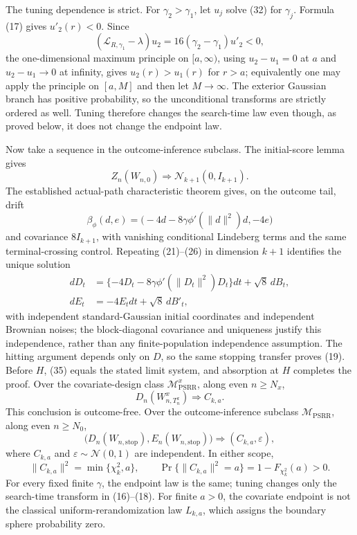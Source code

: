 The tuning dependence is strict.  For \(\gamma_2>\gamma_1\), let \(u_j\) solve (32) for \(\gamma_j\).  Formula (17) gives \(u'_2(r)<0\).  Since
\[
 (\mathcal L_{R,\gamma_1}-\lambda)u_2
 =16(\gamma_2-\gamma_1)u'_2<0, \tag{33}
\]
the one-dimensional maximum principle on \([a,\infty)\), using \(u_2-u_1=0\) at \(a\) and \(u_2-u_1\to0\) at infinity, gives \(u_2(r)>u_1(r)\) for \(r>a\); equivalently one may apply the principle on \([a,M]\) and then let \(M\to\infty\).  The exterior Gaussian branch has positive probability, so the unconditional transforms are strictly ordered as well.  Tuning therefore changes the search-time law even though, as proved below, it does not change the endpoint law.

Now take a sequence in the outcome-inference subclass.  The initial-score lemma gives
\[
 Z_n(W_{n,0})\Rightarrow\mathcal N_{k+1}(0,I_{k+1}). \tag{34}
\]
The established actual-path characteristic theorem gives, on the outcome tail, drift
\[
 \beta_\phi(d,e)=\bigl(-4d-8\gamma\phi'(\|d\|^2)d,-4e\bigr)
\]
and covariance \(8I_{k+1}\), with vanishing conditional Lindeberg terms and the same terminal-crossing control.  Repeating (21)--(26) in dimension \(k+1\) identifies the unique solution
\[
 \begin{split}
 dD_t&=\{-4D_t-8\gamma\phi'(\|D_t\|^2)D_t\}dt+\sqrt8\,dB_t,\\
 dE_t&=-4E_tdt+\sqrt8\,dB'_t,
 \end{split} \tag{35}
\]
with independent standard-Gaussian initial coordinates and independent Brownian noises; the block-diagonal covariance and uniqueness justify this independence, rather than any finite-population independence assumption.  The hitting argument depends only on \(D\), so the same stopping transfer proves (19).  Before \(H\), (35) equals the stated limit system, and absorption at \(H\) completes the proof.
Over the covariate-design class \(\mathcal M_{\mathrm{PSRR}}^{x}\), along even \(n\ge N_x\),
\[
 D_n(W^x_{n,T_n^x})\Rightarrow C_{k,a}.
\]
This conclusion is outcome-free.  Over the outcome-inference subclass \(\mathcal M_{\mathrm{PSRR}}\), along even \(n\ge N_0\),
\[
 \bigl(D_n(W_{n,\mathrm{stop}}),E_n(W_{n,\mathrm{stop}})\bigr)
 \Rightarrow(C_{k,a},\varepsilon),
\]
where \(C_{k,a}\) and \(\varepsilon\sim\mathcal N(0,1)\) are independent.  In either scope,
\[
 \|C_{k,a}\|^2=\min\{\chi_k^2,a\},
 \qquad
 \Pr\{\|C_{k,a}\|^2=a\}=1-F_{\chi_k^2}(a)>0.
\]
For every fixed finite \(\gamma\), the endpoint law is the same; tuning changes only the search-time transform in (16)--(18).  For finite \(a>0\), the covariate endpoint is not the classical uniform-rerandomization law \(L_{k,a}\), which assigns the boundary sphere probability zero.
